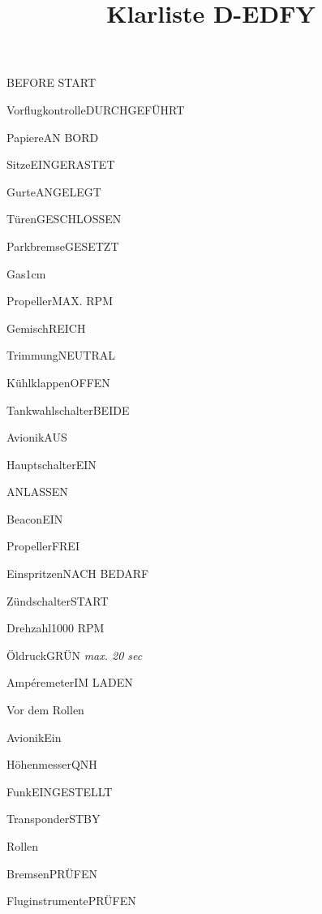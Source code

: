 \documentclass[12pt]{article}
\begin{document}
\title{Klarliste D-EDFY}

  \begin{checklist}{BEFORE START}
    \item{Vorflugkontrolle}{DURCHGEFÜHRT}
    \item{Papiere}{AN BORD}
    \item{Sitze}{EINGERASTET}
    \item{Gurte}{ANGELEGT}
    \item{Türen}{GESCHLOSSEN}
    \item{Parkbremse}{GESETZT}
    \item{Gas}{1cm}
    \item{Propeller}{MAX. RPM}
    \item{Gemisch}{REICH}
    \item{Trimmung}{NEUTRAL}
    \item{Kühlklappen}{OFFEN}
    \item{Tankwahlschalter}{BEIDE}
    \item{Avionik}{AUS}
    \item{Hauptschalter}{EIN}
  \end{checklist}

  \begin{checklist}{ANLASSEN}
    \item{Beacon}{EIN}
    \item{Propeller}{FREI}
    \item{Einspritzen}{NACH BEDARF}
    \item{Zündschalter}{START}
    \item{Drehzahl}{1000 RPM}
    \item{Öldruck}{GRÜN \textit{max. 20 sec}}
    \item{Ampéremeter}{IM LADEN}
  \end{checklist}

  \begin{checklist}{Vor dem Rollen}
    \item{Avionik}{Ein}
    \item{Höhenmesser}{QNH}
    \item{Funk}{EINGESTELLT}
    \item{Transponder}{STBY}
  \end{checklist}

  \begin{checklist}{Rollen}
    \item{Bremsen}{PRÜFEN}
    \item{Fluginstrumente}{PRÜFEN}
  \end{checklist}
\end{document}
